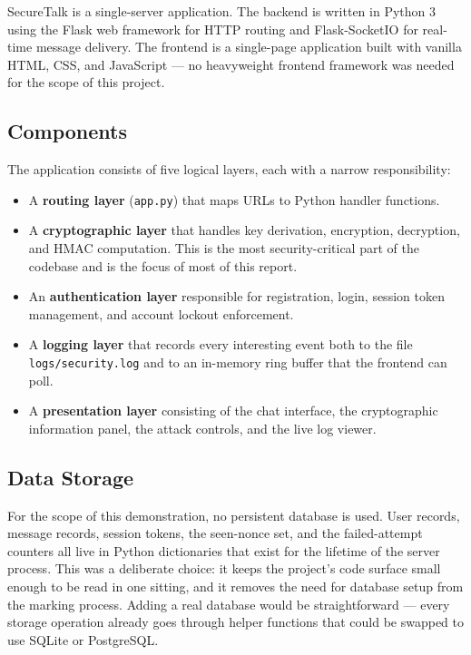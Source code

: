\documentclass[conference]{IEEEtran}
\begin{document}
SecureTalk is a single-server application. The backend is written in Python 3 using the Flask web framework for HTTP routing and Flask-SocketIO for real-time message delivery. The frontend is a single-page application built with vanilla HTML, CSS, and JavaScript --- no heavyweight frontend framework was needed for the scope of this project.

\subsection{Components}
The application consists of five logical layers, each with a narrow responsibility:

\begin{itemize}
    \item A \textbf{routing layer} (\texttt{app.py}) that maps URLs to Python handler functions.
    \item A \textbf{cryptographic layer} that handles key derivation, encryption, decryption, and HMAC computation. This is the most security-critical part of the codebase and is the focus of most of this report.
    \item An \textbf{authentication layer} responsible for registration, login, session token management, and account lockout enforcement.
    \item A \textbf{logging layer} that records every interesting event both to the file \texttt{logs/security.log} and to an in-memory ring buffer that the frontend can poll.
    \item A \textbf{presentation layer} consisting of the chat interface, the cryptographic information panel, the attack controls, and the live log viewer.
\end{itemize}

\subsection{Data Storage}
For the scope of this demonstration, no persistent database is used. User records, message records, session tokens, the seen-nonce set, and the failed-attempt counters all live in Python dictionaries that exist for the lifetime of the server process. This was a deliberate choice: it keeps the project's code surface small enough to be read in one sitting, and it removes the need for database setup from the marking process. Adding a real database would be straightforward --- every storage operation already goes through helper functions that could be swapped to use SQLite or PostgreSQL.
\end{document}

